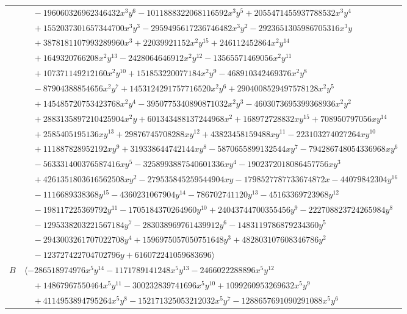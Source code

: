 \documentclass[11pt]{article}
\begin{document}
\begin{longtable}{@{}ll@{}}
 & $\quad -196060326962346432x^{3}y^{6}-1011888322068116592x^{3}y^{5}+2055471455937788532x^{3}y^{4}$\\
 & $\quad +1552037301657344700x^{3}y^{3}-2959495617236746482x^{3}y^{2}-2923651305986705316x^{3}y$\\
 & $\quad +3878181107993289960x^{3}+22039921152x^{2}y^{15}+246112452864x^{2}y^{14}$\\
 & $\quad +1649320766208x^{2}y^{13}-2428064646912x^{2}y^{12}-13565571469056x^{2}y^{11}$\\
 & $\quad +107371149212160x^{2}y^{10}+151853220077184x^{2}y^{9}-468910342469376x^{2}y^{8}$\\
 & $\quad -87904388854656x^{2}y^{7}+1453124291757716520x^{2}y^{6}+2904008529497578128x^{2}y^{5}$\\
 & $\quad +145485720753423768x^{2}y^{4}-3950775340890871032x^{2}y^{3}-4603073695399368936x^{2}y^{2}$\\
 & $\quad +2883135897210425904x^{2}y+601343488137244968x^{2}+168972728832xy^{15}+708950797056xy^{14}$\\
 & $\quad +2585405195136xy^{13}+29876745708288xy^{12}+43823458159488xy^{11}-223103274027264xy^{10}$\\
 & $\quad +111887828952192xy^{9}+319338644742144xy^{8}-5870655899132544xy^{7}-794286748054336968xy^{6}$\\
 & $\quad -563331400376587416xy^{5}-3258993887540601336xy^{4}-1902372018086457756xy^{3}$\\
 & $\quad +4261351803616562508xy^{2}-279535845259544904xy-1798527787733674872x-44079842304y^{16}$\\
 & $\quad -1116689338368y^{15}-4360231067904y^{14}-786702741120y^{13}-45163369723968y^{12}$\\
 & $\quad -198117225369792y^{11}-1705184370264960y^{10}+24043744700355456y^{9}-222708823724265984y^{8}$\\
 & $\quad -1295338203221567184y^{7}-283038969761439912y^{6}-1483119786879234360y^{5}$\\
 & $\quad -2943003261707022708y^{4}+1596975057050751648y^{3}+482803107608346786y^{2}$\\
 & $\quad -123727422704702796y+616072241059683696\rangle$\\
$B$ & $\langle -286518974976x^{5}y^{14}-1171789141248x^{5}y^{13}-2466022288896x^{5}y^{12}$\\
 & $\quad +14867967550464x^{5}y^{11}-300232839741696x^{5}y^{10}+1099260953269632x^{5}y^{9}$\\
 & $\quad +4114953894795264x^{5}y^{8}-152171325053212032x^{5}y^{7}-1288657691090291088x^{5}y^{6}$\\

\end{longtable}
\end{document}
